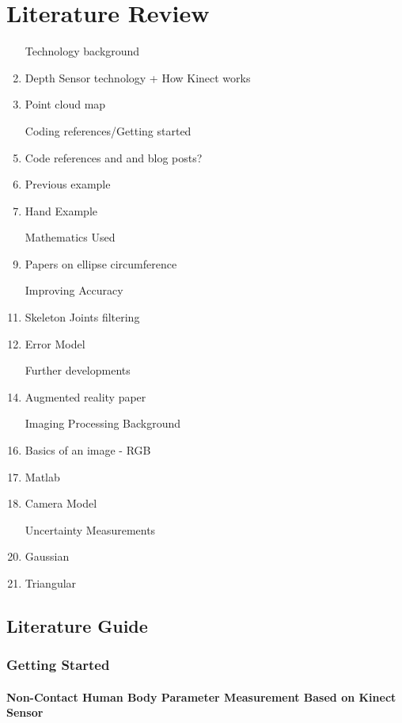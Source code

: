 \chapter{Literature Review}

\begin{enumerate}
	\item [Technology] background 
	\item Depth Sensor technology + How Kinect works
	\item Point cloud map
	
	\item [Coding] references/Getting started
	\item Code references and and blog posts? 
	\item Previous example
	\item Hand Example
	
	\item [Mathematics] Used
	\item Papers on ellipse circumference
	
	\item [Improving] Accuracy
	\item Skeleton Joints filtering
	\item Error Model
	
	\item [Further] developments
	\item Augmented reality paper
	
	\item [Imaging] Processing Background
	\item Basics of an image - RGB
	\item Matlab
	\item Camera Model
	
	\item [Uncertainty] Measurements
	\item Gaussian 
	\item Triangular
\end{enumerate}

\section{Literature Guide}
\subsection{Getting Started}

\subsubsection{Non-Contact Human Body Parameter Measurement Based on Kinect Sensor \cite{nonContact2017}}

